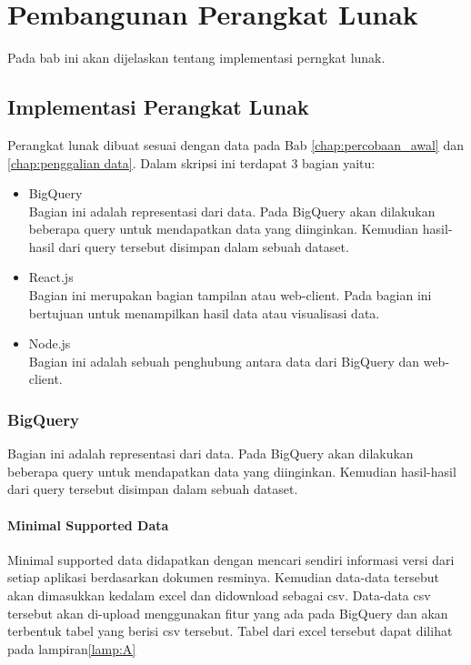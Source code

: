 \chapter{Pembangunan Perangkat Lunak}
\label{chap:pembangunan PL}
Pada bab ini akan dijelaskan tentang implementasi perngkat lunak.
\section{Implementasi Perangkat Lunak}
Perangkat lunak dibuat sesuai dengan data pada Bab \ref{chap:percobaan_awal} dan \ref{chap:penggalian data}. Dalam skripsi ini terdapat 3 bagian yaitu:
\begin{itemize}
	\item BigQuery\\
	Bagian ini adalah representasi dari data. Pada BigQuery akan dilakukan beberapa query untuk mendapatkan data yang diinginkan. Kemudian hasil-hasil dari query tersebut disimpan dalam sebuah dataset.
	\item React.js\\
	Bagian ini merupakan bagian tampilan atau web-client. Pada bagian ini bertujuan untuk menampilkan hasil data atau visualisasi data.
	\item Node.js\\
	Bagian ini adalah sebuah penghubung antara data dari BigQuery dan web-client.
\end{itemize}

\subsection{BigQuery}
Bagian ini adalah representasi dari data. Pada BigQuery akan dilakukan beberapa query untuk mendapatkan data yang diinginkan. Kemudian hasil-hasil dari query tersebut disimpan dalam sebuah dataset.

\subsubsection{Minimal Supported Data}
Minimal supported data didapatkan dengan mencari sendiri informasi versi dari setiap aplikasi berdasarkan dokumen resminya. Kemudian data-data tersebut akan dimasukkan kedalam excel dan didownload sebagai csv. Data-data csv tersebut akan di-upload menggunakan fitur yang ada pada BigQuery dan akan terbentuk tabel yang berisi csv tersebut. Tabel dari excel tersebut dapat dilihat pada lampiran\ref{lamp:A}

